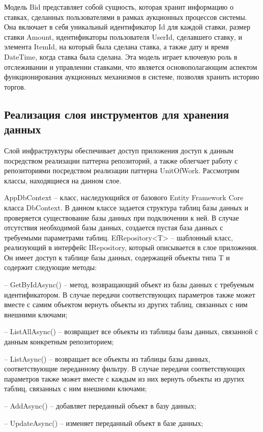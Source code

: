 Модель Bid представляет собой сущность, 
которая хранит информацию о ставках, сделанных пользователями в рамках аукционных процессов системы. 
Она включает в себя уникальный идентификатор Id для каждой ставки, размер ставки Amount, 
идентификаторы пользователя UserId, сделавшего ставку, и элемента ItemId, на который была сделана ставка, 
а также дату и время DateTime, когда ставка была сделана. 
Эта модель играет ключевую роль в отслеживании и управлении ставками, 
что является основополагающим аспектом функционирования аукционных механизмов в системе, 
позволяя хранить историю торгов.


\subsection{Реализация слоя инструментов для хранения данных}

Слой инфраструктуры обеспечивает доступ приложения доступ к данным посредством реализации паттерна репозиторий, 
а также облегчает работу с репозиториями посредством реализации паттерна UnitOfWork. 
Рассмотрим классы, находящиеся на данном слое.

AppDbContext – класс, наследующийся от базового Entity Framework Core класса DbContext. 
В данном классе задается структура таблиц базы данных и проверяется существование базы данных при подключении к ней. 
В случае отсутствия необходимой базы данных, создается пустая база данных с требуемыми параметрами таблиц.
EfRepository<T> – шаблонный класс, реализующий в интерфейс IRepository, который описывается в слое приложения. 
Он имеет доступ к таблице базы данных, содержащей объекты типа T и содержит следующие методы:

– GetByIdAsync() – метод, возвращающий объект из базы данных с требуемым идентификатором. 
В случае передачи соответствующих параметров также может вместе с самим объектом вернуть объекты из других таблиц, 
связанных с ним внешними ключами;
    
– ListAllAsync() – возвращает все объекты из таблицы базы данных, связанной с данным конкретным репозиторием;
    
– ListAsync() – возвращает все объекты из таблицы базы данных, соответствующие переданному фильтру. В
 случае передачи соответствующих параметров также может вместе 
 с каждым из них вернуть объекты из других таблиц, связанных с ним внешними ключами;
    
– AddAsync() – добавляет переданный объект в базу данных;
    
– UpdateAsync() – изменяет переданный объект в базе данных;
    
